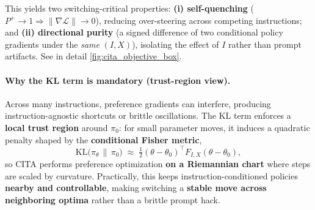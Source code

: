 This yields two switching-critical properties: \textbf{(i) self-quenching} ($P^+\!\to1 \Rightarrow \|\nabla\mathcal{L}\|\to0$), reducing over-steering across competing instructions; and
\textbf{(ii) directional purity} (a signed difference of two conditional policy gradients under the \emph{same} $(I,X)$), isolating the effect of $I$ rather than prompt artifacts. See in detail \cref{fig:cita_objective_box}.

\vspace{-0.35em}
\paragraph{Why the KL term is mandatory (trust-region view).}
Across many instructions, preference gradients can interfere, producing instruction-agnostic shortcuts or brittle oscillations.
The KL term enforces a \textbf{local trust region} around $\pi_0$:
for small parameter moves, it induces a quadratic penalty shaped by the \textbf{conditional Fisher metric},
\vspace{-1mm}
\[
\mathrm{KL}\!\big(\pi_{\theta}\,\|\,\pi_{0}\big)
\;\approx\;
\tfrac{1}{2}(\theta-\theta_0)^{\top}F_{I,X}(\theta-\theta_0),
\]
\vspace{-1mm}
so CITA performs preference optimization \textbf{on a Riemannian chart} where steps are scaled by curvature.
Practically, this keeps instruction-conditioned policies \textbf{nearby and controllable}, making switching a \textbf{stable move across neighboring optima} rather than a brittle prompt hack.



